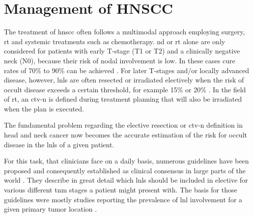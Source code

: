 \documentclass[\relativeRoot/main.tex]{subfiles}
\begin{document}
\section{Management of HNSCC}
\label{sec:intro:management}

The treatment of \gls{hnscc} often follows a multimodal approach employing surgery, \gls{rt} and systemic treatments such as chemotherapy. \Gls{nd} or \gls{rt} alone are only considered for patients with early T-stage (T1 or T2) and a clinically negative neck (N0), because their risk of nodal involvement is low. In these cases cure rates of 70\% to 90\% can be achieved \cite{pfister_head_2014}. For later T-stages and/or locally advanced disease, however, \glspl{lnl} are often resected or irradiated electively when the risk of occult disease exceeds a certain threshold, for example 15\% or 20\% \cite{weiss_use_1997,pitman_rationale_2000,pillsbury_iii_rationale_1997}. In the field of \acrlong{rt}, an \gls{ctv-n} is defined during treatment planning that will also be irradiated when the plan is executed.

The fundamental problem regarding the elective resection or \gls{ctv-n} definition in head and neck cancer now becomes the accurate estimation of the risk for occult disease in the \glspl{lnl} of a given patient.

For this task, that clinicians face on a daily basis, numerous guidelines have been proposed and consequently established as clinical consensus in large parts of the world \cite{gregoire_ct-based_2003,gregoire_delineation_2014,gregoire_delineation_2018,gregoire_proposal_2006,gregoire_selection_2000,biau_selection_2019,eisbruch_intensity-modulated_2002,ferlito_elective_2009,vorwerk_guidelines_2011,chao_determination_2002}. They describe in great detail which \glspl{lnl} should be included in elective  for various different \gls{tnm} stages a patient might present with. The basis for those guidelines were mostly studies reporting the prevalence of \gls{lnl} involvement for a given primary tumor location \cite{candela_patterns_1990,shah_patterns_1990,woolgar_histological_1999,woolgar_topography_2007,chao_determination_2002,vauterin_patterns_2006,razfar_incidence_2009,ho_patterns_2012}.
\end{document}
